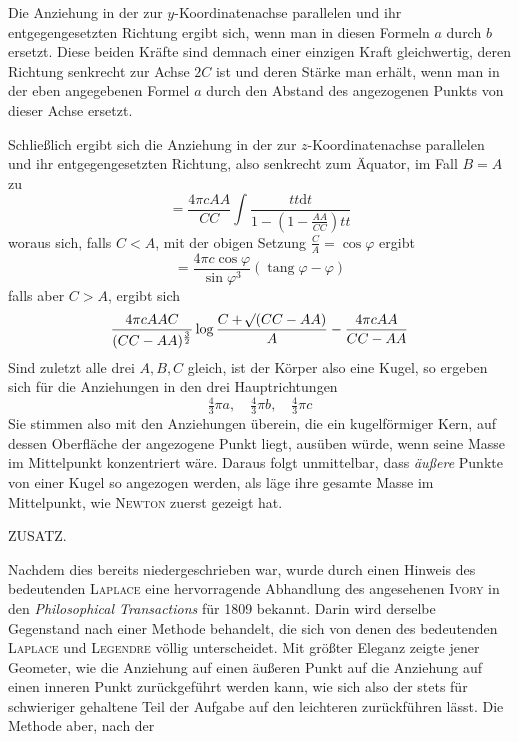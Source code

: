 \par
Die Anziehung in der zur $y$-Koordinatenachse parallelen und ihr entgegengesetzten Richtung ergibt sich, wenn man in diesen Formeln $a$ durch $b$ ersetzt. Diese beiden Kräfte sind demnach einer einzigen Kraft gleichwertig, deren Richtung senkrecht zur Achse $2C$ ist und deren Stärke man erhält, wenn man in der eben angegebenen Formel $a$ durch den Abstand des angezogenen Punkts von dieser Achse ersetzt.

Schließlich ergibt sich die Anziehung in der zur $z$-Koordinatenachse parallelen und ihr entgegengesetzten Richtung, also senkrecht zum Äquator, im Fall $B=A$ zu
\[
=\frac{4\pi cAA}{CC}\int\frac{tt\mathrm{d}t}{1-(1-\frac{AA}{CC})tt}
\]
woraus sich, falls $C<A$, mit der obigen Setzung $\frac{C}{A}=\cos\varphi$ ergibt
\[
=\frac{4\pi c\cos\varphi}{\sin\varphi^3}(\operatorname{tang}\varphi-\varphi)
\]
falls aber $C>A$, ergibt sich
\[
\frac{4\pi cAAC}{(CC-AA)^{\frac32}}\log\frac{C+\mathord{{}^{}\!\surd}(CC-AA)}{A}-\frac{4\pi cAA}{CC-AA}
\]
Sind zuletzt alle drei $A,B,C$ gleich, ist der Körper also eine Kugel, so ergeben sich für die Anziehungen in den drei Hauptrichtungen
\[
\tfrac43\pi a,\quad\tfrac43\pi b,\quad\tfrac43\pi c
\]
Sie stimmen also mit den Anziehungen überein, die ein kugelförmiger Kern, auf dessen Oberfläche der angezogene Punkt liegt, ausüben würde, wenn seine Masse im Mittelpunkt konzentriert wäre. Daraus folgt unmittelbar, dass \textit{äußere} Punkte von einer Kugel so angezogen werden, als läge ihre gesamte Masse im Mittelpunkt, wie \textsc{Newton} zuerst gezeigt hat.

\par\bigskip{}
\centerline{ZUSATZ.}\medskip
\par
Nachdem dies bereits niedergeschrieben war, wurde durch einen Hinweis des bedeutenden \textsc{Laplace} eine hervorragende Abhandlung des angesehenen \textsc{Ivory} in den \textit{Philosophical Transactions} für 1809 bekannt. Darin wird derselbe Gegenstand nach einer Methode behandelt, die sich von denen des bedeutenden \textsc{Laplace} und \textsc{Legendre} völlig unterscheidet. Mit größter Eleganz zeigte jener Geometer, wie die Anziehung auf einen äußeren Punkt auf die Anziehung auf einen inneren Punkt zurückgeführt werden kann, wie sich also der stets für schwieriger gehaltene Teil der Aufgabe auf den leichteren zurückführen lässt. Die Methode aber, nach der

